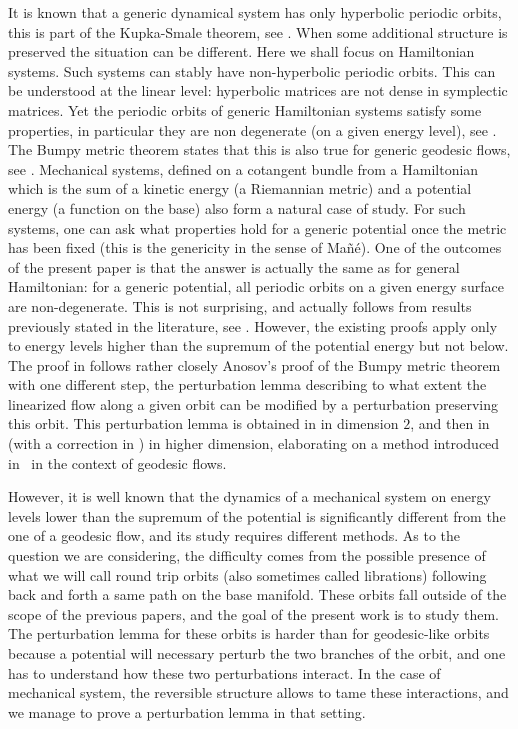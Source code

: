 \documentclass[11pt]{article}
\theoremstyle{plain}
\theoremstyle{definition}
\begin{document}
It is known that a generic dynamical system has only hyperbolic periodic orbits, this is part of the Kupka-Smale theorem, see
\cite{K63,S63}. When some additional structure is preserved the situation can be different. Here we shall focus on Hamiltonian systems.
Such systems can stably have non-hyperbolic periodic orbits.
This can be understood at the linear level: hyperbolic matrices are not dense in symplectic matrices.
Yet the periodic orbits of generic Hamiltonian systems satisfy some properties, in particular they are non degenerate (on a given energy level), see \cite{CR1,CR2}. The Bumpy metric theorem states that this is also true for generic geodesic flows, see \cite{A68,A82}.
Mechanical systems, defined on a cotangent bundle from a Hamiltonian
which is the sum of a kinetic energy (a Riemannian metric) and a potential energy (a function on the base)
also form a natural case of study.
For such systems, one can ask what properties hold for a generic potential once the metric has been fixed
(this is the genericity in the sense of Mañé).
One of the outcomes of the present paper is that the answer is actually the same as for general Hamiltonian: for a generic potential, all periodic orbits on a given energy surface are non-degenerate.
This is not surprising, and actually follows from results previously stated in the literature, see \cite{O08,RR}.
However, the existing proofs apply only to energy levels higher than the supremum of the potential energy but not below.
The proof in \cite{O08} follows rather closely Anosov's proof of the Bumpy metric theorem
with one different step, the perturbation lemma describing to what extent the linearized flow along a given orbit can be modified by a perturbation preserving this orbit. This perturbation lemma is obtained in \cite{O08} in dimension $2$, and then in \cite{RR}
(with a correction in \cite{AB}) in higher dimension, elaborating on
a method introduced in~\cite{Co10} in the context of geodesic flows.

However, it is well known that the dynamics of a mechanical system on energy levels lower than the supremum of the potential is
significantly different from the one of a geodesic flow, and its study requires different methods. As to the question we are considering, the difficulty comes from the possible presence of what we will call round trip orbits (also sometimes called librations)
following back and forth a same path on the base manifold.
These orbits fall outside of the scope of the previous papers,
and the goal of the present work is to study them.
The perturbation lemma for these orbits is harder than for geodesic-like orbits because
a potential will necessary perturb the two branches of the orbit, and one has to understand how these two perturbations interact.
In the case of mechanical system, the reversible structure allows to tame these interactions, and we manage to prove a perturbation lemma in that setting.
\end{document}
